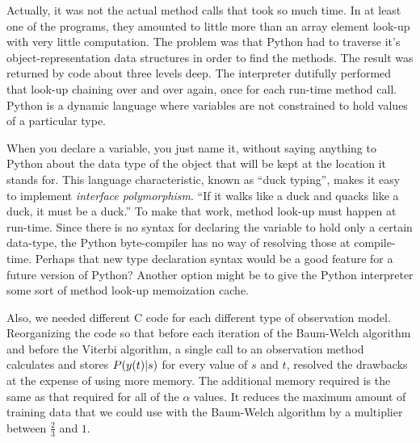 Actually, it was not the actual method calls that took so much time.
In at least one of the programs, they amounted to little more than an
array element look-up with very little computation.  The problem was
that Python had to traverse it's object-representation data structures
in order to find the methods.  The result was returned by code about
three levels deep.  The interpreter dutifully performed that look-up
chaining over and over again, once for each run-time method call.
Python is a dynamic language where variables are not constrained to
hold values of a particular type.

When you declare a variable, you just name it, without saying anything
to Python about the data type of the object that will be kept at the
location it stands for.  This language characteristic, known as ``duck
typing'', makes it easy to implement \emph{interface polymorphism}.
``If it walks like a duck and quacks like a duck, it must be a duck.''
To make that work, method look-up must happen at run-time.  Since
there is no syntax for declaring the variable to hold only a certain
data-type, the Python byte-compiler has no way of resolving those at
compile-time.  Perhaps that new type declaration syntax would be a
good feature for a future version of Python?  Another option might be
to give the Python interpreter some sort of method look-up memoization
cache.

Also, we needed different C code for each different type of
observation model.  Reorganizing the code so that before each
iteration of the Baum-Welch algorithm and before the Viterbi
algorithm, a single call to an observation method calculates and
stores $P({y}{(t)}|s)$ for every value of $s$ and $t$, resolved the
drawbacks at the expense of using more memory.  The additional memory
required is the same as that required for all of the $\alpha$ values.
It reduces the maximum amount of training data that we could use with
the Baum-Welch algorithm by a multiplier between $\frac{2}{3}$ and
$1$.


